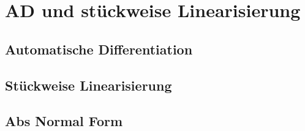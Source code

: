 \chapter{AD und stückweise Linearisierung}

\section{Automatische Differentiation}
\section{Stückweise Linearisierung}
\section{Abs Normal Form}